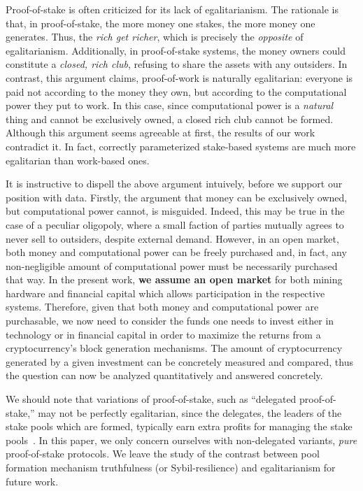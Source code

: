 
Proof-of-stake is often criticized for its lack of egalitarianism. The
rationale is that, in proof-of-stake, the more money one stakes, the more money
one generates. Thus, the \emph{rich get richer}, which is precisely the
\emph{opposite} of egalitarianism. Additionally, in proof-of-stake systems, the
money owners could constitute a \emph{closed, rich club}, refusing to share the
assets with any outsiders.  In contrast, this argument claims, proof-of-work is
naturally egalitarian: everyone is paid not according to the money they own,
but according to the computational power they put to work. In this case, since
computational power is a \emph{natural} thing and cannot be exclusively owned,
a closed rich club cannot be formed.
Although this argument seems agreeable at first, the results of our work contradict it.
In fact, correctly parameterized stake-based systems are much more egalitarian than work-based ones.

It is instructive to dispell the above argument intuively, before we support
our position with data. Firstly, the argument that money can be exclusively
owned, but computational power cannot, is misguided. Indeed, this may be true
in the case of a peculiar oligopoly, where a small faction of parties mutually
agrees to never sell to outsiders, despite external demand. However, in an open
market, both money and computational power can be freely purchased and, in
fact, any non-negligible amount of computational power must be necessarily
purchased that way.
In the present work, \textbf{we assume an open market} for both mining hardware
and financial capital which allows participation in the respective systems.
Therefore, given that both money and computational power
are purchasable, we now need to consider the funds one needs to invest either in
technology or in financial capital in order to maximize the returns from a
cryptocurrency's block generation mechanisms. The amount of cryptocurrency
generated by a given investment can be concretely measured and compared, thus
the question can now be analyzed quantitatively and answered concretely.

We should
note that variations of proof-of-stake, such as ``delegated proof-of-stake,''
may not be perfectly egalitarian, since the delegates, \ie the leaders of
the stake pools which are formed, typically earn extra profits for managing the
stake pools~\cite{stouka-koutsoupias-kiayias}. In this paper, we only concern
ourselves with non-delegated variants, \ie \emph{pure} proof-of-stake protocols.
We leave the study of the contrast between pool formation mechanism truthfulness
(or Sybil-resilience) and egalitarianism for future work.
